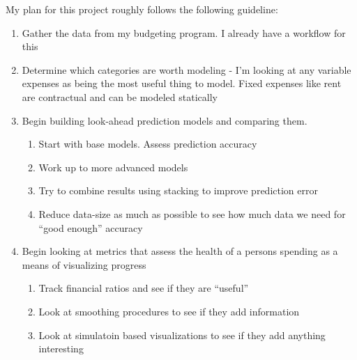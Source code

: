 \documentclass[11pt,a4paper]{article}
\begin{document}
My plan for this project roughly follows the following guideline:
\begin{enumerate}
	\item Gather the data from my budgeting program. I already have a workflow for this
	\item Determine which categories are worth modeling - I'm looking at any variable expenses as being the most useful thing to model. Fixed expenses like rent are contractual and can be modeled statically
	\item Begin building look-ahead prediction models and comparing them. 
	\begin{enumerate}
		\item Start with base models. Assess prediction accuracy
		\item Work up to more advanced models
		\item Try to combine results using stacking to improve prediction error
		\item Reduce data-size as much as possible to see how much data we need for ``good enough'' accuracy
	\end{enumerate}
	\item Begin looking at metrics that assess the health of a persons spending as a means of visualizing progress
	\begin{enumerate}
		\item Track financial ratios and see if they are ``useful''
		\item Look at smoothing procedures to see if they add information
		\item Look at simulatoin based visualizations to see if they add anything interesting
	\end{enumerate}
\end{enumerate}


%
\end{document}

